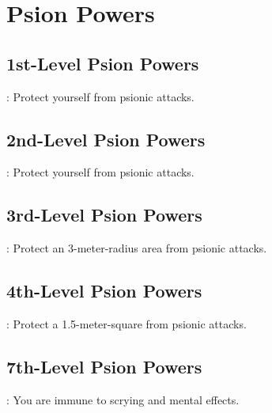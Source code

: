 \section{Psion Powers}



\subsection{1st-Level Psion Powers}

: Protect yourself from psionic attacks.



\subsection{2nd-Level Psion Powers}

: Protect yourself from psionic attacks.



\subsection{3rd-Level Psion Powers}

: Protect an 3-meter-radius area from psionic attacks.



\subsection{4th-Level Psion Powers}

: Protect a 1.5-meter-square from psionic attacks.



\subsection{7th-Level Psion Powers}

: You are immune to scrying and mental effects.
